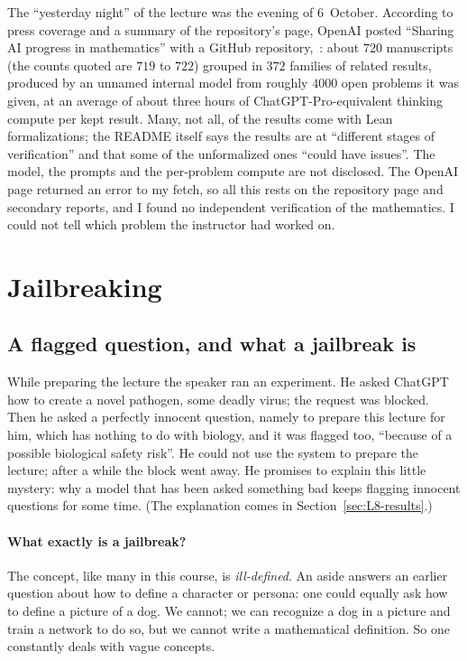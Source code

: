 \begin{beyond}
The ``yesterday night'' of the lecture was the evening of 6~October. According to press coverage and a summary of the repository's page, OpenAI posted ``Sharing AI progress in mathematics'' with a GitHub repository, \,\citep{openai2026math}: about $720$ manuscripts (the counts quoted are $719$ to $722$) grouped in $372$ families of related results, produced by an unnamed internal model from roughly $4000$ open problems it was given, at an average of about three hours of ChatGPT-Pro-equivalent thinking compute per kept result. Many, not all, of the results come with Lean formalizations; the README itself says the results are at ``different stages of verification'' and that some of the unformalized ones ``could have issues''. The model, the prompts and the per-problem compute are not disclosed. The OpenAI page returned an error to my fetch, so all this rests on the repository page and secondary reports, and I found no independent verification of the mathematics. I could not tell which problem the instructor had worked on.
\end{beyond}

\section{Jailbreaking}\label{sec:L8-jailbreak}

\subsection{A flagged question, and what a jailbreak is}\label{sec:L8-what}
While preparing the lecture the speaker ran an experiment. He asked ChatGPT how to create a novel pathogen, some deadly virus; the request was blocked. Then he asked a perfectly innocent question, namely to prepare this lecture for him, which has nothing to do with biology, and it was flagged too, ``because of a possible biological safety risk''. He could not use the system to prepare the lecture; after a while the block went away. He promises to explain this little mystery: why a model that has been asked something bad keeps flagging innocent questions for some time. (The explanation comes in Section~\ref{sec:L8-results}.)

\paragraph{What exactly is a jailbreak?}
The concept, like many in this course, is \emph{ill-defined}. An aside answers an earlier question about how to define a character or persona: one could equally ask how to define a picture of a dog. We cannot; we can recognize a dog in a picture and train a network to do so, but we cannot write a mathematical definition. So one constantly deals with vague concepts.

